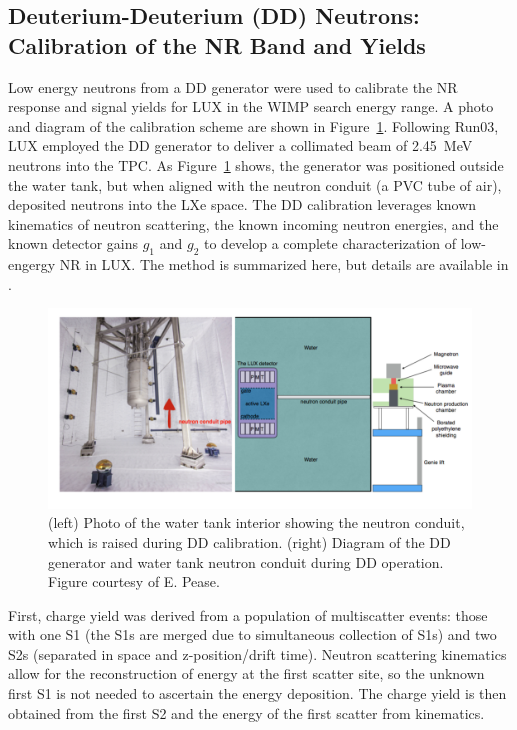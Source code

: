 \subsection{Deuterium-Deuterium (DD) Neutrons: Calibration of the NR Band and Yields}
\label{sec:DD}
Low energy neutrons from a \ac{DD} generator were used to calibrate the \ac{NR} response and signal yields for \ac{LUX} in the \ac{WIMP} search energy range. A photo and diagram of the calibration scheme are shown in Figure~\ref{fig:dd_gen}. Following Run03, \ac{LUX} employed the \ac{DD} generator to deliver a collimated beam of 2.45~MeV neutrons into the \ac{TPC}. As Figure~\ref{fig:dd_gen} shows, the generator was positioned outside the water tank, but when aligned with the neutron conduit (a \ac{PVC} tube of air), deposited neutrons into the \ac{LXe} space. The \ac{DD} calibration leverages known kinematics of neutron scattering, the known incoming neutron energies, and the known detector gains $g_{1}$ and $g_{2}$ to develop a complete characterization of low-engergy \ac{NR} in \ac{LUX}. The method is summarized here, but details are available in \cite{LUXDD}.

\begin{figure}[htbp]
\begin{center}
\includegraphics[width=\textwidth]{figures/lux/lux_ddgenerator.png}
\caption{(left) Photo of the water tank interior showing the neutron conduit, which is raised during \acs{DD} calibration. (right) Diagram of the \acs{DD} generator and water tank neutron conduit during \acs{DD} operation. Figure courtesy of E. Pease.}
\label{fig:dd_gen}
\end{center}
\end{figure}

First, charge yield was derived from a population of multiscatter events: those with one S1 (the S1s are merged due to simultaneous collection of S1s) and two S2s (separated in space and z-position/drift time). Neutron scattering kinematics allow for the reconstruction of energy at the first scatter site, so the unknown first S1 is not needed to ascertain the energy deposition. The charge yield is then obtained from the first S2 and the energy of the first scatter from kinematics. 

